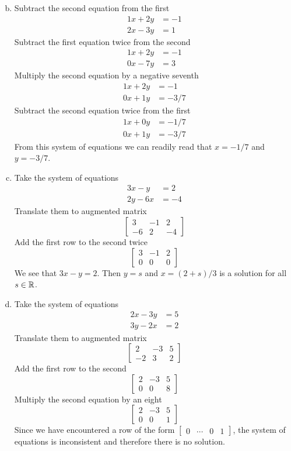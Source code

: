 \documentclass[../main.tex]{subfiles}
\begin{document}
\solution
\begin{enumerate}[a)]
	\setcounter{enumi}{1}
	\item Subtract the second equation from the first
		\begin{align*}
			1x + 2y &= -1 \\
			2x - 3y &= 1
		\end{align*}
		Subtract the first equation twice from the second
		\begin{align*}
			1x + 2y &= -1 \\
			0x - 7y &= 3
		\end{align*}
		Multiply the second equation by a negative seventh
		\begin{align*}
			1x + 2y &= -1 \\
			0x + 1y &= -3/7
		\end{align*}
		Subtract the second equation twice from the first
		\begin{align*}
			1x + 0y &= -1/7 \\
			0x + 1y &= -3/7
		\end{align*}
		From this system of equations we can readily read that $x = -1/7$ and $y = -3/7$.
	\setcounter{enumi}{3}
	\item 
		Take the system of equations
		\begin{align*}
			3x - y &= 2 \\
			2y - 6x &= -4
		\end{align*}
		Translate them to augmented matrix
		$$\left[\begin{array}{cc|c}
			3 & -1 & 2 \\
			-6 & 2 & -4
		\end{array}\right]$$
		Add the first row to the second twice
		$$\left[\begin{array}{cc|c}
			3 & -1 & 2 \\
			0 & 0 & 0
		\end{array}\right]$$
		We see that $3x - y = 2$.
		Then $y = s$ and $x = (2 + s)/3$ is a solution for all $s \in \operatorname{\mathbb{R}}$.
	\setcounter{enumi}{5}
	\item 
		Take the system of equations
		\begin{align*}
			2x - 3y &= 5 \\
			3y - 2x &= 2
		\end{align*}
		Translate them to augmented matrix
		$$\left[\begin{array}{cc|c}
			2 & -3 & 5 \\
			-2 & 3 & 2
		\end{array}\right]$$
		Add the first row to the second
		$$\left[\begin{array}{cc|c}
			2 & -3 & 5 \\
			0 & 0 & 8
		\end{array}\right]$$
		Multiply the second equation by an eight
		$$\left[\begin{array}{cc|c}
			2 & -3 & 5 \\
			0 & 0 & 1
		\end{array}\right]$$
		Since we have encountered a row of the form $\left[\begin{array}{ccc|c}0&\cdots&0&1\end{array}\right]$, the system of equations is inconsistent and therefore there is no solution.
\end{enumerate}
\end{document}
